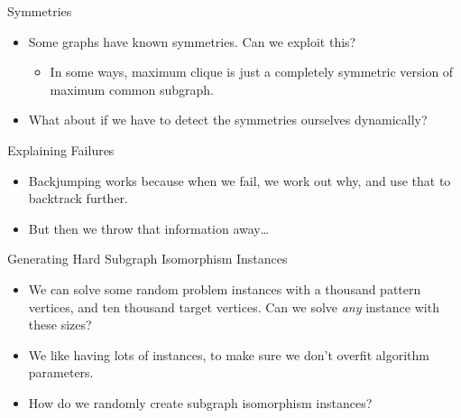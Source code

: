 \documentclass{beamer}
\begin{document}
\begin{frame}{Symmetries}

    \begin{itemize}
        \item Some graphs have known symmetries. Can we exploit this?

            \begin{itemize}
                \item In some ways, maximum clique is just a completely symmetric version of maximum
                    common subgraph.
            \end{itemize}

        \item What about if we have to detect the symmetries ourselves dynamically?
    \end{itemize}

\end{frame}

\begin{frame}{Explaining Failures}

    \begin{itemize}
        \item Backjumping works because when we fail, we work out why, and use that to backtrack
            further.

        \item But then we throw that information away\ldots
    \end{itemize}

\end{frame}

\begin{frame}{Generating Hard Subgraph Isomorphism Instances}

    \begin{itemize}
        \item We can solve some random problem instances with a thousand pattern vertices, and ten
            thousand target vertices. Can we solve \emph{any} instance with these sizes?

        \item We like having lots of instances, to make sure we don't overfit algorithm parameters.

        \item How do we randomly create subgraph isomorphism instances?
    \end{itemize}

\end{frame}
\end{document}
